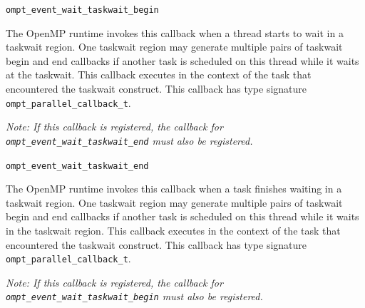 \documentclass{article}
\newcommand{\descheader}[1]{{\needspace{3\baselineskip}\vspace{1em}\noindent \fbox{#1}}}
\begin{document}
\begin{description}

\item \verb|ompt_event_wait_taskwait_begin|
  
   The OpenMP runtime invokes this callback 
when a thread starts to
   wait in a taskwait region. 
One taskwait region may generate multiple pairs of taskwait begin and end callbacks if another task is scheduled on this thread while it waits at the taskwait. 
This callback
   executes in the context of the task that encountered the taskwait construct. %
   This callback has type signature \verb|ompt_parallel_callback_t|. 
   
   {\em Note: If this callback is
   registered, the callback for \verb|ompt_event_wait_taskwait_end| must also
   be registered.}


\item \verb|ompt_event_wait_taskwait_end|
  
   The OpenMP runtime invokes this callback 
when a task finishes
   waiting in a taskwait region. 
One taskwait region may generate multiple pairs of taskwait begin and end callbacks if another task is scheduled on this thread while it waits in the taskwait region.
This callback
   executes in the context of the task that encountered the taskwait construct.  %
   This callback has type signature \verb|ompt_parallel_callback_t|. 
   
   {\em Note: If this callback is
   registered, the callback for \verb|ompt_event_wait_taskwait_begin| must
   also be registered.}


\end{description}


\descheader{Taskgroup Idling}
\end{document}

